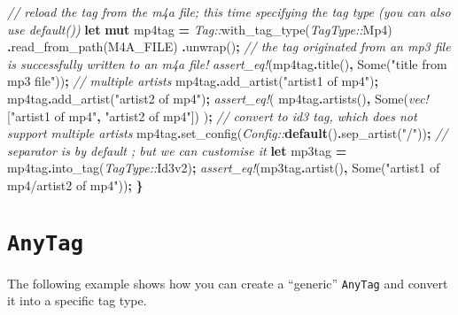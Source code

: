 \documentclass[
]{book}
\newenvironment{Shaded}{\begin{snugshade}}{\end{snugshade}}
\newcommand{\CommentTok}[1]{\textcolor[rgb]{0.56,0.35,0.01}{\textit{#1}}}
\newcommand{\ConstantTok}[1]{\textcolor[rgb]{0.00,0.00,0.00}{#1}}
\newcommand{\KeywordTok}[1]{\textcolor[rgb]{0.13,0.29,0.53}{\textbf{#1}}}
\newcommand{\NormalTok}[1]{#1}
\newcommand{\OperatorTok}[1]{\textcolor[rgb]{0.81,0.36,0.00}{\textbf{#1}}}
\newcommand{\PreprocessorTok}[1]{\textcolor[rgb]{0.56,0.35,0.01}{\textit{#1}}}
\newcommand{\StringTok}[1]{\textcolor[rgb]{0.31,0.60,0.02}{#1}}
\begin{document}
\begin{Shaded}
\begin{Highlighting}[]
    \CommentTok{// reload the tag from the m4a file; this time specifying the tag type (you can also use \textasciigrave{}default()\textasciigrave{})}
    \KeywordTok{let} \KeywordTok{mut}\NormalTok{ mp4tag }\OperatorTok{=} \PreprocessorTok{Tag::}\NormalTok{with\_tag\_type(}\PreprocessorTok{TagType::}\NormalTok{Mp4)}
        \OperatorTok{.}\NormalTok{read\_from\_path(M4A\_FILE)}
        \OperatorTok{.}\NormalTok{unwrap()}\OperatorTok{;}
    \CommentTok{// the tag originated from an mp3 file is successfully written to an m4a file!}
    \PreprocessorTok{assert\_eq!}\NormalTok{(mp4tag}\OperatorTok{.}\NormalTok{title()}\OperatorTok{,} \ConstantTok{Some}\NormalTok{(}\StringTok{"title from mp3 file"}\NormalTok{))}\OperatorTok{;}
    \CommentTok{// multiple artists}
\NormalTok{    mp4tag}\OperatorTok{.}\NormalTok{add\_artist(}\StringTok{"artist1 of mp4"}\NormalTok{)}\OperatorTok{;}
\NormalTok{    mp4tag}\OperatorTok{.}\NormalTok{add\_artist(}\StringTok{"artist2 of mp4"}\NormalTok{)}\OperatorTok{;}
    \PreprocessorTok{assert\_eq!}\NormalTok{(}
\NormalTok{        mp4tag}\OperatorTok{.}\NormalTok{artists()}\OperatorTok{,}
        \ConstantTok{Some}\NormalTok{(}\PreprocessorTok{vec!}\NormalTok{[}\StringTok{"artist1 of mp4"}\OperatorTok{,} \StringTok{"artist2 of mp4"}\NormalTok{])}
\NormalTok{    )}\OperatorTok{;}
    \CommentTok{// convert to id3 tag, which does not support multiple artists}
\NormalTok{    mp4tag}\OperatorTok{.}\NormalTok{set\_config(}\PreprocessorTok{Config::}\KeywordTok{default}\NormalTok{()}\OperatorTok{.}\NormalTok{sep\_artist(}\StringTok{"/"}\NormalTok{))}\OperatorTok{;}
    \CommentTok{// separator is by default \textasciigrave{};\textasciigrave{} but we can customise it}
    \KeywordTok{let}\NormalTok{ mp3tag }\OperatorTok{=}\NormalTok{ mp4tag}\OperatorTok{.}\NormalTok{into\_tag(}\PreprocessorTok{TagType::}\NormalTok{Id3v2)}\OperatorTok{;}
    \PreprocessorTok{assert\_eq!}\NormalTok{(mp3tag}\OperatorTok{.}\NormalTok{artist()}\OperatorTok{,} \ConstantTok{Some}\NormalTok{(}\StringTok{"artist1 of mp4/artist2 of mp4"}\NormalTok{))}\OperatorTok{;}
\OperatorTok{\}}
\end{Highlighting}
\end{Shaded}

\hypertarget{anytag}{%
\chapter{\texorpdfstring{\texttt{AnyTag}}{AnyTag}}\label{anytag}}

The following example shows how you can create a ``generic'' \texttt{AnyTag} and convert it into a specific tag type.
\end{document}
